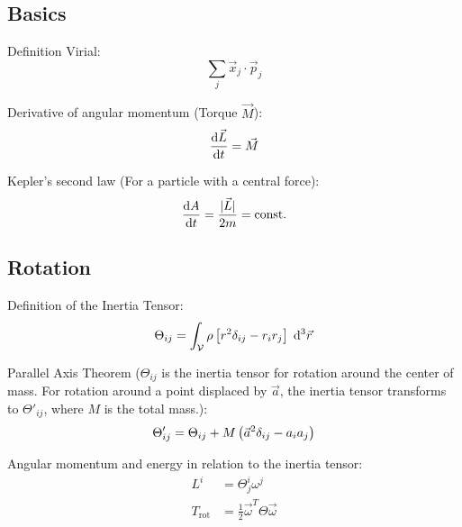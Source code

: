 	\subsection{Basics}
		\noindent
		Definition Virial:
		\begin{equation}
			\sum_j \vec{x}_j\cdot\vec{p}_j
		\end{equation}

		\noindent
		Derivative of angular momentum (Torque $\vec{M}$):
		\begin{equation}
			\frac{\mathrm{d} \vec{L}}{\mathrm{d} t} = \vec{M}
		\end{equation}

		\noindent
		Kepler's second law (For a particle with a central force):%
		\begin{equation}
			\frac{\mathrm{d} A}{\mathrm{d} t} = \frac{| \vec{L} |}{2 m} = \mathrm{const.}
		\end{equation}

	\subsection{Rotation}
		\noindent
		Definition of the Inertia Tensor:
		\begin{equation}
			\Theta_{ij}=\int_{\mathcal{V}} \rho \left[r^2\delta_{ij}-r_i r_j\right] \;\mathrm{d}^3\vec{r}
		\end{equation}

		\noindent
		Parallel Axis Theorem ($\Theta_{ij}$ is the inertia tensor for rotation around the center of mass.
		For rotation around a point displaced by $\vec{a}$, the inertia tensor transforms to $\Theta'_{ij}$, where $M$ is the total mass.):%
		\begin{equation}
			\Theta'_{ij} = \Theta_{ij} + M\left( \vec{a}^2\delta_{ij} - a_i a_j \right)
		\end{equation}

		\noindent
		Angular momentum and energy in relation to the inertia tensor:%
		\begin{equation}
			\begin{aligned}
				L^i &= \Theta^i_j \omega^j \\
				T_{\mathrm{rot}} &= \frac{1}{2}\vec{\omega}^T \Theta \vec{\omega}
			\end{aligned}
		\end{equation}

